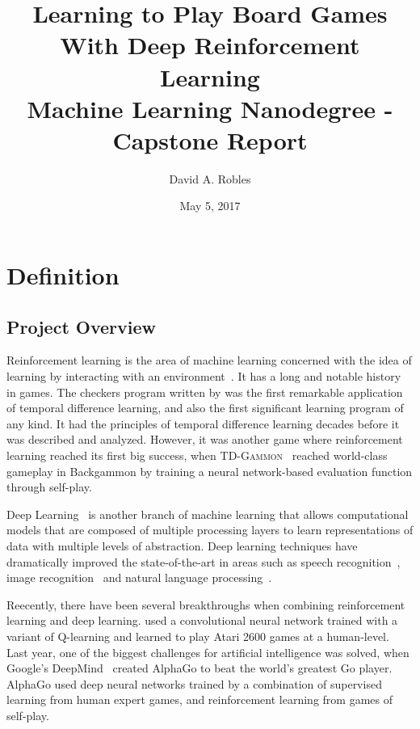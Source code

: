\documentclass{article}
\title{Learning to Play Board Games With Deep Reinforcement Learning \\
       Machine Learning Nanodegree - Capstone Report}
\author{David A. Robles}
\date{May 5, 2017}
\begin{document}
\maketitle

\section{Definition}

\subsection{Project Overview}

Reinforcement learning is the area of machine learning concerned with the idea of learning by
interacting with an environment~\citep{Sutton1998RL}. It has a long and notable history in games.
The checkers program written by \citet{Samuel1959Checkers} was the first remarkable application of
temporal difference learning, and also the first significant learning program of any kind. It had
the principles of temporal difference learning decades before it was described and analyzed.
However, it was another game where reinforcement learning reached its first big success, when
\textsc{TD-Gammon}~\citep{Tesauro1995TD} reached world-class gameplay in Backgammon by training a
neural network-based evaluation function through self-play.

Deep Learning~\citep{LeCun2015Nature} is another branch of machine learning that allows
computational models that are composed of multiple processing layers to learn representations of
data with multiple levels of abstraction. Deep learning techniques have dramatically improved the
state-of-the-art in areas such as speech recognition~\citep{Hinton2012Speech}, image
recognition~\citep{Krizhevsky2012ImageNet} and natural language processing~\citep{Colbert2012}.

Reecently, there have been several breakthroughs when combining reinforcement learning and deep
learning. \cite{Mnih2015AtariNature} used a convolutional neural network trained with a variant of
Q-learning and learned to play Atari 2600 games at a human-level. Last year, one of the biggest
challenges for artificial intelligence was solved, when Google's DeepMind~\citep{Silver2016GoNature}
created AlphaGo to beat the world's greatest Go player. AlphaGo used deep neural networks trained by
a combination of supervised learning from human expert games, and reinforcement learning from games
of self-play.
\end{document}
